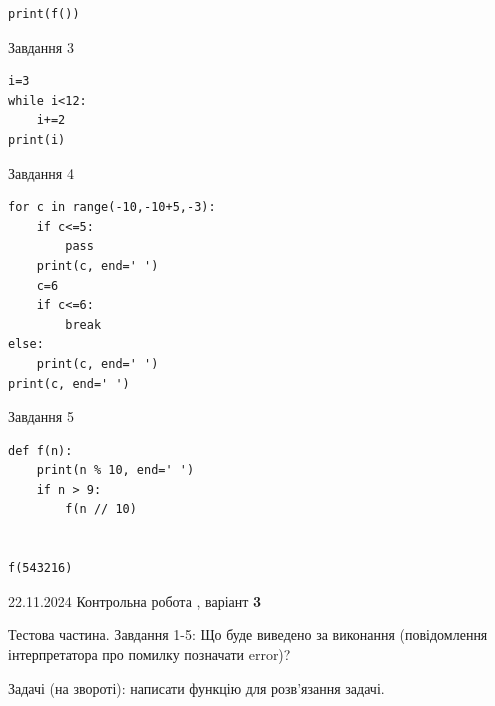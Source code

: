 \documentclass[12pt, ukrainian]{article}
\begin{document}
{{\begin{minipage}[t]{8.5cm}
\begin{verbatim}
print(f())
\end{verbatim}


\vspace{5mm}
               
{\begin{center}Завдання {3}\end{center}}
\vspace{-6mm}

\begin{verbatim}
i=3
while i<12:
    i+=2
print(i)
\end{verbatim}


\end{minipage}
\vline \hspace{6mm}
\begin{minipage}[t]{10.7cm}
               
{\begin{center}Завдання {4}\end{center}}
\vspace{-6mm}

\begin{verbatim}
for c in range(-10,-10+5,-3):
    if c<=5:
        pass
    print(c, end=' ')
    c=6
    if c<=6:
        break
else:
    print(c, end=' ')
print(c, end=' ')
\end{verbatim}


\vspace{5mm}
               
{\begin{center}Завдання {5}\end{center}}
\vspace{-6mm}

\begin{verbatim}
def f(n):
    print(n % 10, end=' ')
    if n > 9:
        f(n // 10)
    

f(543216)
\end{verbatim}


\end{minipage}

\newpage

{{22.11.2024 Контрольна робота , варіант  \No \textbf { 3 }\par}}
{

Тестова частина. Завдання 1-5: Що буде виведено за виконання (повідомлення інтерпретатора про помилку позначати error)?

Задачі (на звороті): написати функцію для розв'язання задачі.

}}}
\end{document}
